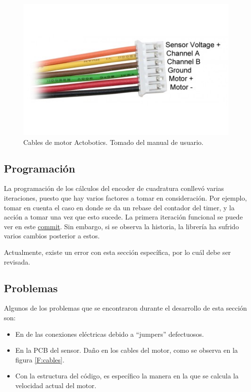 \begin{figure}[h!]
\centering
\includegraphics[scale=0.8]{imagenes/actoboticscables.jpg}
\caption{Cables de motor Actobotics. Tomado del manual de usuario.}
\label{F:actoboticscables}
\end{figure}

\subsection{Programación}

La programación de los cálculos del encoder de cuadratura conllevó varias iteraciones, puesto que hay varios factores a tomar en consideración. Por ejemplo, tomar en cuenta el caso en donde se da un rebase del contador del timer, y la acción a tomar una vez que esto sucede. La primera iteración funcional se puede ver en este \href{https://github.com/arcoslab/stm32-roboclaw/commit/c81a49b71de4a6a7cb5188abe2c16fd31c0b9cf0#diff-bff6209bf0949743f46f878a7d4c8c2c}{commit}. Sin embargo, si se observa la historia, la librería ha sufrido varios cambios posterior a estos.

Actualmente, existe un error con esta sección específica, por lo cuál debe ser revisada.

\subsection{Problemas}

Algunos de los problemas que se encontraron durante el desarrollo de esta sección son:

\begin{itemize}
\item En de las conexiones eléctricas debido a ``jumpers'' defectuosos.
\item En la PCB del sensor. Daño en los cables del motor, como se observa en la figura \ref{F:cables}.
\item Con la estructura del código, es específico la manera en la que se calcula la velocidad actual del motor.
\end{itemize}

